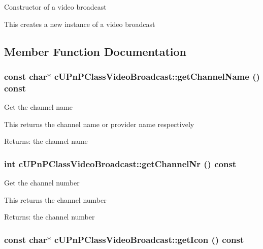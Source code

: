 Constructor of a video broadcast

This creates a new instance of a video broadcast 

\subsection{Member Function Documentation}
\hypertarget{classcUPnPClassVideoBroadcast_b63ea63a4ab8ac3cb654b0bab4df620a}{
\subsubsection[{getChannelName}]{\setlength{\rightskip}{0pt plus 5cm}const char$\ast$ cUPnPClassVideoBroadcast::getChannelName () const}}
\label{classcUPnPClassVideoBroadcast_b63ea63a4ab8ac3cb654b0bab4df620a}


Get the channel name

This returns the channel name or provider name respectively

\begin{Desc}
\item[Returns:]the channel name \end{Desc}
\hypertarget{classcUPnPClassVideoBroadcast_6065509557e13176878098861fcfeb9d}{
\subsubsection[{getChannelNr}]{\setlength{\rightskip}{0pt plus 5cm}int cUPnPClassVideoBroadcast::getChannelNr () const}}
\label{classcUPnPClassVideoBroadcast_6065509557e13176878098861fcfeb9d}


Get the channel number

This returns the channel number

\begin{Desc}
\item[Returns:]the channel number \end{Desc}
\hypertarget{classcUPnPClassVideoBroadcast_f4c2a9f5d62e41d853385b7b7685d536}{
\subsubsection[{getIcon}]{\setlength{\rightskip}{0pt plus 5cm}const char$\ast$ cUPnPClassVideoBroadcast::getIcon () const}}
\label{classcUPnPClassVideoBroadcast_f4c2a9f5d62e41d853385b7b7685d536}



